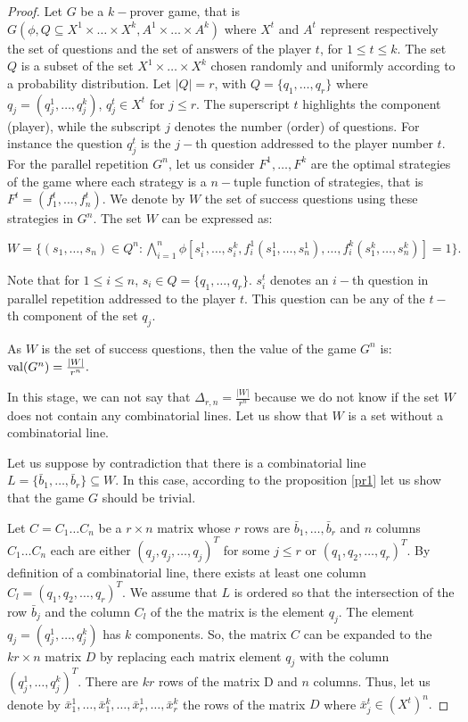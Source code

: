 \begin{proof}
  Let $G$ be a $k-$prover game, that is $G(\phi, Q\subseteq X^1 \times \ldots \times X^k, A^1 \times \ldots \times A^k)$ where $X^t$ and $A^t$ represent respectively the set of questions and the set of answers of the player $t$, for $1\leq t \leq k.$ The set $Q$ is a subset of the set $X^1 \times \ldots \times X^k$ chosen randomly and uniformly according to a probability distribution.
  Let $|Q|=r$, with $Q=\{q_1, \ldots, q_r\}$ where $q_j=(q_j^1,\ldots, q_j^k)$, $q_j^t \in X^t$ for $j\leq r.$ The superscript  $t$ highlights the component (player), while the subscript $j$ denotes the number (order) of questions. For instance the question $q_j^t$ is the $j-$th question addressed to the player number $t.$  For the parallel repetition $G^n$, let us consider $F^1, \ldots, F^k$ are the optimal strategies of the game where each strategy is a $n-$tuple function of strategies, that is $F^t=(f_1^t,\ldots, f_n^t)$. We denote by $W$ the set of success questions using these strategies in $G^n.$ The set $W$ can be expressed as: 
 
$W=\{(s_1, \ldots, s_n) \in Q^n: \bigwedge\limits_{i=1}^n \phi \left[ s_i^1, \ldots, s_i^k, f_i^1(s_1^1, \ldots, s_n^1), \ldots, f_i^k(s_1^k, \ldots, s_n^k) \right]=1 \}.$

Note that for $1\leq i \leq n$,  $s_i \in Q=\{q_1, \ldots, q_r\}.$ $s_i^t$ denotes an $i-$th question in parallel repetition addressed to the player $t$. This question can be any of the $t-$th component of the set  $q_j.$
 
As $W$ is the set of success questions, then the value of the game $G^n$ is: $\mathrm{val} (G^n) = \frac{|W|}{r^n}.$
 
In this stage, we can not say that $\Delta_{r,n}=\frac{|W|}{r^n}$
because we do not know if the set  $W$ does not contain any combinatorial lines. Let us show that $W$ is a set without a combinatorial line.

Let us suppose by contradiction that there is a combinatorial line $L=\{\bar{b}_1, \ldots, \bar{b}_r \} \subseteq W.$ In this case, according to the proposition \eqref{pr1} let us show that the game  $G$ should be trivial.
 
Let $C=C_1\ldots C_n$ be a $r \times n$ matrix whose $r$ rows are $\bar{b}_1, \ldots, \bar{b}_r$ and $n$ columns $C_1\ldots C_n$ each are either $(q_j,q_j,\ldots,q_j)^T$ for some $j\leq r$ or $(q_1,q_2,\ldots,q_r)^T.$ By definition of a combinatorial line, there exists at least one column $C_l=(q_1,q_2,\ldots,q_r)^T.$ We assume that $L$ is ordered so that the intersection of the row $\bar{b}_j$ and the column $C_l$ of the the matrix is the element $q_j.$ The element $q_j=(q_j^1,\ldots, q_j^k)$ has $k$ components. So, the  matrix $C$ can be expanded to the $kr \times n$ matrix $D$ by replacing each matrix element $q_j$ with the column $(q_j^1,\ldots, q_j^k)^T.$ There are $kr$ rows of the matrix D and $n$ columns. Thus, let us denote by $\bar{x}_1^1, \ldots, \bar{x}_1^k, \ldots, \bar{x}_r^1, \ldots, \bar{x}_r^k$ the rows of the matrix $D$ where $\bar{x}_j^t \in  (X^t)^n.$


\end{proof}
